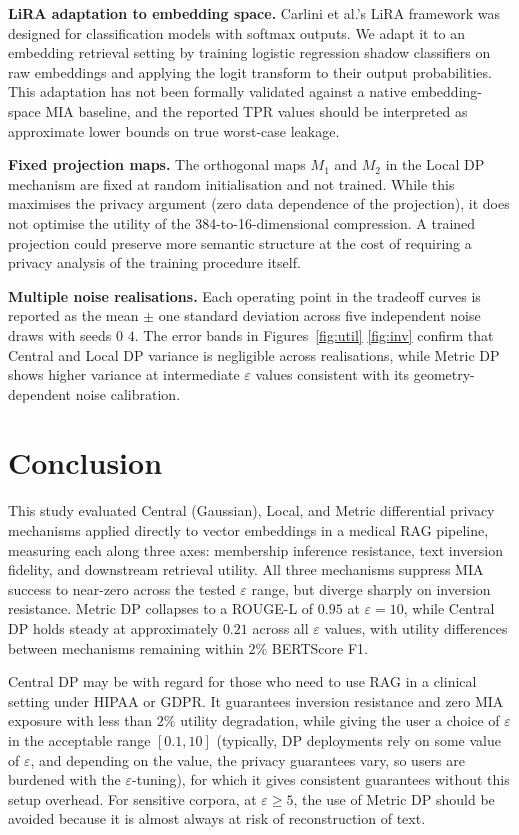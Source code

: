 \documentclass[11pt, a4paper]{article}
\begin{document}
\textbf{LiRA adaptation to embedding space.} Carlini et al.'s LiRA framework
was designed for classification models with softmax outputs. We adapt it to an
embedding retrieval setting by training logistic regression shadow classifiers
on raw embeddings and applying the logit transform to their output
probabilities. This adaptation has not been formally validated against a
native embedding-space MIA baseline, and the reported TPR values should be
interpreted as approximate lower bounds on true worst-case leakage.

\textbf{Fixed projection maps.} The orthogonal maps $M_1$ and $M_2$ in the
Local DP mechanism are fixed at random initialisation and not trained. While
this maximises the privacy argument (zero data dependence of the projection),
it does not optimise the utility of the 384-to-16-dimensional compression.
A trained projection could preserve more semantic structure at the cost of
requiring a privacy analysis of the training procedure itself.

\textbf{Multiple noise realisations.} Each operating point in the tradeoff
curves is reported as the mean $\pm$ one standard deviation across five
independent noise draws with seeds $0$ $4$. The error bands in
Figures~\ref{fig:util} \ref{fig:inv} confirm that Central and Local DP
variance is negligible across realisations, while Metric DP shows higher
variance at intermediate $\varepsilon$ values consistent with its
geometry-dependent noise calibration.

\section{Conclusion}

This study evaluated Central (Gaussian), Local, and Metric differential privacy mechanisms applied directly to vector embeddings in a medical RAG pipeline, measuring each along three axes: membership inference resistance, text inversion fidelity, and downstream retrieval utility. All three mechanisms suppress MIA success to near-zero across the tested $\varepsilon$ range, but diverge sharply on inversion resistance. Metric DP collapses to a ROUGE-L of $0.95$ at $\varepsilon = 10$, while Central DP holds steady at approximately $0.21$ across all $\varepsilon$ values, with utility differences between mechanisms remaining within $2\%$ BERTScore F1.

Central DP may be with regard for those who need to use RAG in a clinical setting under HIPAA or GDPR. It guarantees inversion resistance and zero MIA exposure with less than $2\%$ utility degradation, while giving the user a choice of $\varepsilon$ in the acceptable range $[0.1, 10]$ (typically, DP deployments rely on some value of $\varepsilon$, and depending on the value, the privacy guarantees vary, so users are burdened with the $\varepsilon$-tuning), for which it gives consistent guarantees without this setup overhead. For sensitive corpora, at $\varepsilon \geq 5$, the use of Metric DP should be avoided because it is almost always at risk of reconstruction of text.
\end{document}

